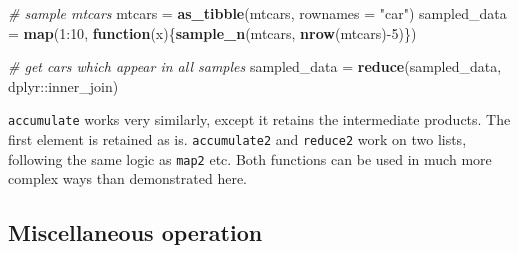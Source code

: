 \documentclass[]{book}
\newenvironment{Shaded}{}{}
\newcommand{\CommentTok}[1]{\textcolor[rgb]{0.38,0.63,0.69}{\textit{#1}}}
\newcommand{\ControlFlowTok}[1]{\textcolor[rgb]{0.00,0.44,0.13}{\textbf{#1}}}
\newcommand{\DataTypeTok}[1]{\textcolor[rgb]{0.56,0.13,0.00}{#1}}
\newcommand{\DecValTok}[1]{\textcolor[rgb]{0.25,0.63,0.44}{#1}}
\newcommand{\KeywordTok}[1]{\textcolor[rgb]{0.00,0.44,0.13}{\textbf{#1}}}
\newcommand{\NormalTok}[1]{#1}
\newcommand{\OperatorTok}[1]{\textcolor[rgb]{0.40,0.40,0.40}{#1}}
\newcommand{\StringTok}[1]{\textcolor[rgb]{0.25,0.44,0.63}{#1}}
\begin{document}
\begin{Shaded}
\begin{Highlighting}[]
\CommentTok{# sample mtcars}
\NormalTok{mtcars =}\StringTok{ }\KeywordTok{as_tibble}\NormalTok{(mtcars, }\DataTypeTok{rownames =} \StringTok{"car"}\NormalTok{)}
\NormalTok{sampled_data =}\StringTok{ }\KeywordTok{map}\NormalTok{(}\DecValTok{1}\OperatorTok{:}\DecValTok{10}\NormalTok{, }\ControlFlowTok{function}\NormalTok{(x)\{}\KeywordTok{sample_n}\NormalTok{(mtcars, }\KeywordTok{nrow}\NormalTok{(mtcars)}\OperatorTok{-}\DecValTok{5}\NormalTok{)\})}

\CommentTok{# get cars which appear in all samples}
\NormalTok{sampled_data =}\StringTok{ }\KeywordTok{reduce}\NormalTok{(sampled_data, dplyr}\OperatorTok{::}\NormalTok{inner_join)}
\end{Highlighting}
\end{Shaded}

\texttt{accumulate} works very similarly, except it retains the intermediate products. The first element is retained as is. \texttt{accumulate2} and \texttt{reduce2} work on two lists, following the same logic as \texttt{map2} etc.
Both functions can be used in much more complex ways than demonstrated here.

\begin{Shaded}
\end{Shaded}

\hypertarget{miscellaneous-operation}{%
\subsection{Miscellaneous operation}\label{miscellaneous-operation}}
\end{document}
